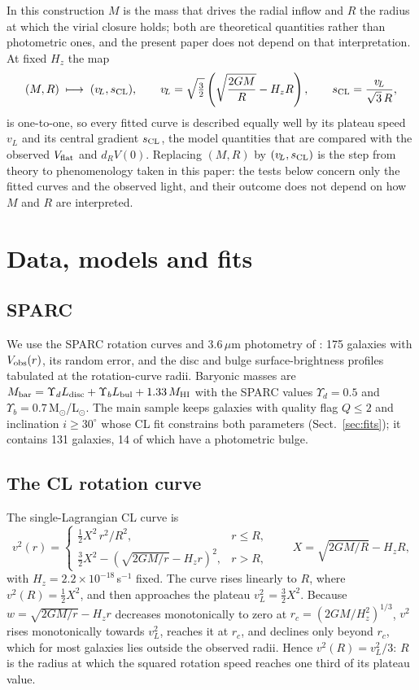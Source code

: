\documentclass[11pt,a4paper]{article}
\newcommand{\vL}{v_{\!L}}
\newcommand{\sCL}{s_{\rm CL}}
\newcommand{\Mbar}{M_{\rm bar}}
\newcommand{\Vf}{V_{\rm flat}}
\begin{document}
In this construction $M$ is the mass that drives the radial inflow and $R$ the radius at which the virial closure holds; both are theoretical quantities rather than photometric ones, and the present paper does not depend on that interpretation. At fixed $H_z$ the map
\begin{equation}
(M,R)\;\longmapsto\;(\vL,\sCL),\qquad \vL=\sqrt{\tfrac32}\left(\sqrt{\frac{2GM}{R}}-H_zR\right),\qquad \sCL=\frac{\vL}{\sqrt3\,R},
\label{eq:map}
\end{equation}
is one-to-one, so every fitted curve is described equally well by its plateau speed $\vL$ and its central gradient $\sCL$, the model quantities that are compared with the observed $\Vf$ and $d_RV(0)$. Replacing $(M,R)$ by $(\vL,\sCL)$ is the step from theory to phenomenology taken in this paper: the tests below concern only the fitted curves and the observed light, and their outcome does not depend on how $M$ and $R$ are interpreted.

\section{Data, models and fits}
\label{sec:data}

\subsection{SPARC}
We use the SPARC rotation curves and 3.6\,$\mu$m photometry of \citet{Lelli2016sparc}: 175 galaxies with $V_{\rm obs}(r)$, its random error, and the disc and bulge surface-brightness profiles tabulated at the rotation-curve radii. Baryonic masses are $\Mbar=\Upsilon_d L_{\rm disc}+\Upsilon_b L_{\rm bul}+1.33\,M_{\rm HI}$ with the SPARC values $\Upsilon_d=0.5$ and $\Upsilon_b=0.7$\,M$_\odot$/L$_\odot$. The main sample keeps galaxies with quality flag $Q\le2$ and inclination $i\ge30^\circ$ whose CL fit constrains both parameters (Sect.~\ref{sec:fits}); it contains 131 galaxies, 14 of which have a photometric bulge.

\subsection{The CL rotation curve}
The single-Lagrangian CL curve is \citep{deHaas2018,deHaas2025b}
\begin{equation}
v^2(r)=\begin{cases}
\tfrac12 X^2\,r^2/R^2, & r\le R,\\[3pt]
\tfrac32 X^2-\left(\sqrt{2GM/r}-H_zr\right)^2, & r>R,
\end{cases}
\qquad X=\sqrt{2GM/R}-H_zR,
\label{eq:cl}
\end{equation}
with $H_z=2.2\times10^{-18}$\,s$^{-1}$ fixed. The curve rises linearly to $R$, where $v^2(R)=\tfrac12X^2$, and then approaches the plateau $\vL^2=\tfrac32X^2$. Because $w=\sqrt{2GM/r}-H_zr$ decreases monotonically to zero at $r_c=(2GM/H_z^2)^{1/3}$, $v^2$ rises monotonically towards $\vL^2$, reaches it at $r_c$, and declines only beyond $r_c$, which for most galaxies lies outside the observed radii. Hence $v^2(R)=\vL^2/3$: $R$ is the radius at which the squared rotation speed reaches one third of its plateau value.
\end{document}
